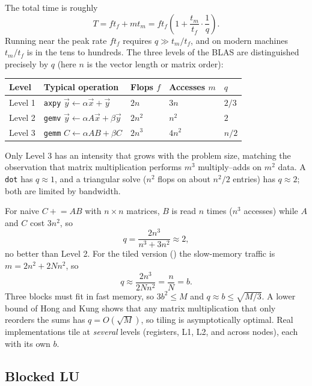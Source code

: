 The total time is roughly
\begin{equation}
  T = f t_f + m t_m = f t_f \left(1 + \frac{t_m}{t_f} \cdot \frac{1}{q}\right).
\end{equation}
Running near the peak rate $f t_f$ requires $q \gg t_m / t_f$, and on modern machines $t_m / t_f$ is in the tens to hundreds. The three levels of the BLAS are distinguished precisely by $q$ (here $n$ is the vector length or matrix order):
\begin{center}
\begin{tabular}{lllll}
  \toprule
  Level & Typical operation & Flops $f$ & Accesses $m$ & $q$ \\
  \midrule
  Level 1 & \texttt{axpy} $\vec{y} \gets \alpha\vec{x} + \vec{y}$ & $2n$ & $3n$ & $2/3$ \\
  Level 2 & \texttt{gemv} $\vec{y} \gets \alpha A\vec{x} + \beta\vec{y}$ & $2n^2$ & $n^2$ & $2$ \\
  Level 3 & \texttt{gemm} $C \gets \alpha AB + \beta C$ & $2n^3$ & $4n^2$ & $n/2$ \\
  \bottomrule
\end{tabular}
\end{center}
Only Level 3 has an intensity that grows with the problem size, matching the observation that matrix multiplication performs $m^3$ multiply--adds on $m^2$ data. A \texttt{dot} has $q \approx 1$, and a triangular solve ($n^2$ flops on about $n^2/2$ entries) has $q \approx 2$; both are limited by bandwidth.

For naive $C \mathrel{+}= AB$ with $n \times n$ matrices, $B$ is read $n$ times ($n^3$ accesses) while $A$ and $C$ cost $3n^2$, so
\begin{equation}
  q = \frac{2n^3}{n^3 + 3n^2} \approx 2,
\end{equation}
no better than Level 2. For the tiled version () the slow-memory traffic is $m = 2n^2 + 2Nn^2$, so
\begin{equation}
  q \approx \frac{2n^3}{2Nn^2} = \frac{n}{N} = b.
\end{equation}
Three blocks must fit in fast memory, so $3b^2 \le M$ and $q \approx b \le \sqrt{M/3}$. A lower bound of Hong and Kung shows that any matrix multiplication that only reorders the sums has $q = O(\sqrt{M})$, so tiling is asymptotically optimal. Real implementations tile at \emph{several} levels (registers, L1, L2, and across nodes), each with its own $b$.

\subsection{Blocked LU}
\label{sec:blocked-lu}

